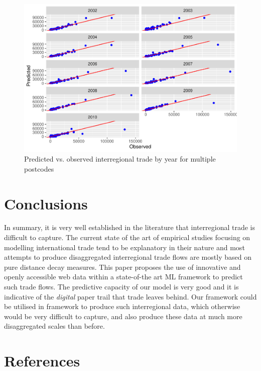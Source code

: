 \documentclass[sigconf]{acmart}
\begin{document}
\begin{figure}[p]
	\includegraphics[width=1\linewidth]{hl_files/figure-latex/unnamed-chunk-11-1} \caption{\label{prediction_multi_pc}Predicted vs. observed interregional trade by year for multiple postcodes}\label{fig:unnamed-chunk-11}
\end{figure}

\hypertarget{sec:6}{%
	\section{Conclusions}\label{sec:6}}

In summary, it is very well established in the literature that
interregional trade is difficult to capture. The current state of the
art of empirical studies focusing on modelling international trade tend
to be explanatory in their nature and most attempts to produce
disaggregated interregional trade flows are mostly based on pure
distance decay measures. This paper proposes the use of innovative and
openly accessible web data within a state-of-the art ML framework to
predict such trade flows. The predictive capacity of our model is very
good and it is indicative of the \emph{digital} paper trail that trade
leaves behind. Our framework could be utilised in framework to produce
such interregional data, which otherwise would be very difficult to
capture, and also produce these data at much more disaggregated scales
than before.

\section{References}



\end{document}
